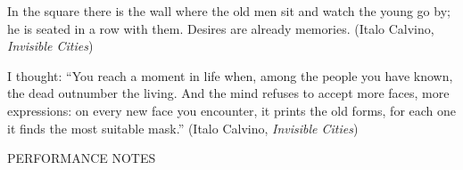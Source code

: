 \documentclass[11pt]{article}
\begin{document}
\begingroup
\begin{center}
In the square there is the wall where the old men sit and watch the young go by; he is seated in a row with them. Desires are already memories.
\rightskip\leftskip
\phantom{text} \hfill (Italo Calvino, \textit{Invisible Cities})
\end{center}
\endgroup

\begingroup
\begin{center}
I thought: ``You reach a moment in life when, among the people you have known, the dead outnumber the living. And the mind refuses to accept more faces, more expressions: on every new face you encounter, it prints the old forms, for each one it finds the most suitable mask.''
\rightskip\leftskip
\phantom{text} \hfill (Italo Calvino, \textit{Invisible Cities})
\end{center}
\endgroup

\vspace*{5\baselineskip}

\begin{center}
\huge PERFORMANCE NOTES
\end{center}
\end{document}
